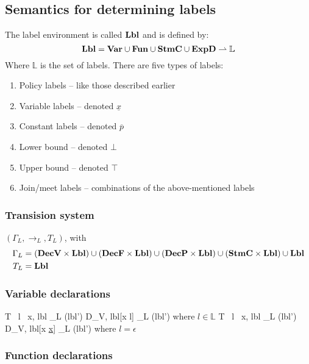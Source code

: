 \subsection{Semantics for determining labels}
The label environment is called $\mathbf{Lbl}$ and is defined by:
\[
  \mathbf{Lbl} = \mathbf{Var} \cup \mathbf{Fun} \cup \mathbf{StmC} \cup \mathbf{ExpD} \rightharpoonup \mathbb{L}
\]
Where $\mathbb{L}$ is the set of labels.
There are five types of labels:
\begin{enumerate}
  \item Policy labels -- like those described earlier
  \item Variable labels -- denoted $\underline{x}$
  \item Constant labels -- denoted $\overline{p}$
  \item Lower bound -- denoted $\bot$
  \item Upper bound -- denoted $\top$
  \item Join/meet labels -- combinations of the above-mentioned labels
\end{enumerate}

\subsubsection{Transision system}
$(\Gamma_{L}, \rightarrow_{L}, T_{L})$, with
\begin{align*}
  \Gamma_{L} & = (\mathbf{DecV} \times \mathbf{Lbl}) \cup (\mathbf{DecF} \times \mathbf{Lbl}) \cup (\mathbf{DecP} \times \mathbf{Lbl}) \cup (\mathbf{StmC} \times \mathbf{Lbl}) \cup \mathbf{Lbl} \\
  T_{L} & = \mathbf{Lbl}
\end{align*}

\subsubsection{Variable declarations}

      {\langle T \, l \, x, lbl \rangle \rightarrow_L (lbl')}
      {\langle D_V, lbl[x \mapsto l] \rangle \rightarrow_L (lbl')}
      {where $l \in \mathbb{L}$}
      {\langle T \, l \, x, lbl \rangle \rightarrow_L (lbl')}
      {\langle D_V, lbl[x \mapsto \underline{x}] \rangle \rightarrow_L (lbl')}
      {where $l = \epsilon$}

\subsubsection{Function declarations}

